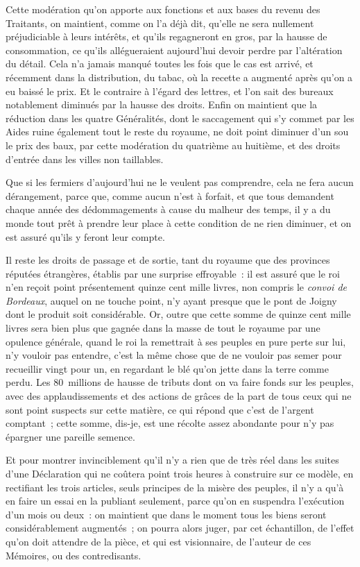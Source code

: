 \documentclass[french,twoside]{book} %
\begin{document}
Cette modération qu’on apporte aux fonctions et aux bases du revenu des Traitants, on maintient, comme on l’a déjà dit, qu’elle ne sera nullement préjudiciable à leurs intérêts, et qu’ils regagneront en gros, par la hausse de consommation, ce qu’ils allégueraient aujourd’hui devoir perdre par l’altération du détail. Cela n’a jamais manqué toutes les fois que le cas est arrivé, et récemment dans la distribution, du tabac, où la recette a augmenté après qu’on a eu baissé le prix. Et le contraire à l’égard des lettres, et l’on sait des bureaux notablement diminués par la hausse des droits. Enfin on maintient que la réduction dans les quatre Généralités, dont le saccagement qui s’y commet par les Aides ruine également tout le reste du royaume, ne doit point diminuer d’un sou le prix des baux, par cette modération du quatrième au huitième, et des droits d’entrée dans les villes non taillables.\par
Que si les fermiers d’aujourd’hui ne le veulent pas comprendre, cela ne fera aucun dérangement, parce que, comme aucun n’est à forfait, et que tous demandent chaque année des dédommagements à cause du malheur des temps, il y a du monde tout prêt à prendre leur place à cette condition de ne rien diminuer, et on est assuré qu’ils y feront leur compte.\par
Il reste les droits de passage et de sortie, tant du royaume que des provinces réputées étrangères, établis par une surprise effroyable : il est assuré que le roi n’en reçoit point présentement quinze cent mille livres, non compris le {\itshape convoi de Bordeaux}, auquel on ne touche point, n’y ayant presque que le pont de Joigny dont le produit soit considérable. Or, outre que cette somme de quinze cent mille livres sera bien plus que gagnée dans la masse de tout le royaume par une opulence générale, quand le roi la remettrait à ses peuples en pure perte sur lui, n’y vouloir pas entendre, c’est la même chose que de ne vouloir pas semer pour recueillir vingt pour un, en regardant le blé qu’on jette dans la terre comme perdu. Les 80 millions de hausse de tributs dont on va faire fonds sur les peuples, avec des applaudissements et des actions de grâces de la part de tous ceux qui ne sont point suspects sur cette matière, ce qui répond que c’est de l’argent comptant ; cette somme, dis-je, est une récolte assez abondante pour n’y pas épargner une pareille semence.\par
Et pour montrer invinciblement qu’il n’y a rien que de très réel dans les suites d’une Déclaration qui ne coûtera point trois heures à construire sur ce modèle, en rectifiant les trois articles, seuls principes de la misère des peuples, il n’y a qu’à en faire un essai en la publiant seulement, parce qu’on en suspendra l’exécution d’un mois ou deux : on maintient que dans le moment tous les biens seront considérablement augmentés ; on pourra alors juger, par cet échantillon, de l’effet qu’on doit attendre de la pièce, et qui est visionnaire, de l’auteur de ces Mémoires, ou des contredisants.\par
\end{document}

